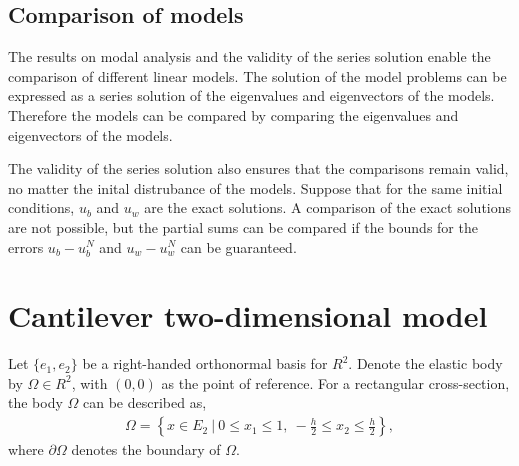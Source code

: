 	\subsection*{Comparison of models}
		The results on modal analysis and the validity of the series solution enable the comparison of different linear models. The solution of the model problems can be expressed as a series solution of the eigenvalues and eigenvectors of the models. Therefore the models can be compared by comparing the eigenvalues and eigenvectors of the models.

		The validity of the series solution also ensures that the comparisons remain valid, no matter the inital distrubance of the models. Suppose that for the same initial conditions, $u_b$ and $u_w$ are the exact solutions. A comparison of the exact solutions are not possible, but the partial sums can be compared if the bounds for the errors $u_b - u^N_b$ and $u_w - u^N_w$ can be guaranteed.

\section{Cantilever two-dimensional model}\label{ssec:2D_Model:FEM}
Let $\{e_1,e_2\}$ be a right-handed orthonormal basis for $R^2$. Denote the elastic body by $\Omega \in R^2$, with $(0,0)$ as the point of reference. For a rectangular cross-section, the body $\Omega$ can be described as,
\begin{eqnarray*}
	\Omega = \left \{ x \in E_2 \ | \ 0 \leq x_1 \leq 1, \ -\frac{h}{2} \leq x_2 \leq \frac{h}{2} \right \},
\end{eqnarray*} where $\partial \Omega$ denotes the boundary of $\Omega$. 

\FloatBarrier

